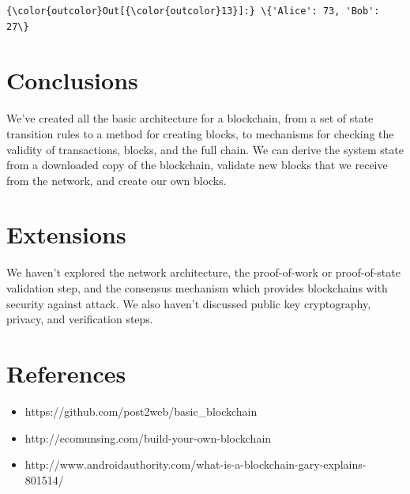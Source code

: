 \documentclass[11pt]{article}
\providecommand{\tightlist}{%
      \setlength{\itemsep}{0pt}\setlength{\parskip}{0pt}}
\begin{document}
\begin{Verbatim}[commandchars=\\\{\}]
{\color{outcolor}Out[{\color{outcolor}13}]:} \{'Alice': 73, 'Bob': 27\}
\end{Verbatim}
            
    \section{Conclusions}\label{conclusions}

We've created all the basic architecture for a blockchain, from a set of
state transition rules to a method for creating blocks, to mechanisms
for checking the validity of transactions, blocks, and the full chain.
We can derive the system state from a downloaded copy of the blockchain,
validate new blocks that we receive from the network, and create our own
blocks.

    \section{Extensions}\label{extensions}

We haven't explored the network architecture, the proof-of-work or
proof-of-state validation step, and the consensus mechanism which
provides blockchains with security against attack. We also haven't
discussed public key cryptography, privacy, and verification steps.

    \section{References}\label{references}

\begin{itemize}
\tightlist
\item
  https://github.com/post2web/basic\_blockchain
\item
  http://ecomunsing.com/build-your-own-blockchain
\item
  http://www.androidauthority.com/what-is-a-blockchain-gary-explains-801514/
\end{itemize}


    
    
    
    
\end{document}
